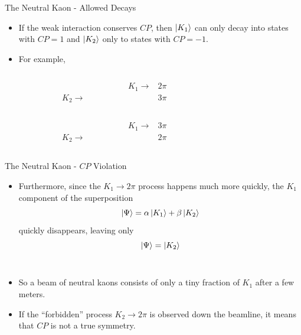 \documentclass{beamer}
\begin{document}
\begin{frame}{The Neutral Kaon \-- Allowed Decays}
  \begin{itemize}
    \item If the weak interaction conserves $CP$, then $\ket{K_1}$ can only decay into states with $CP=1$ and $\ket{K_2}$ only to states with $CP=-1$.
    \pause\
  \item For example,
    \begin{columns}
      \begin{column}{0.5\textwidth}
      \begin{align*}
        \quad \quad \quad \quad \quad \quad \quad \quad K_1 \rightarrow& 2\pi \\
        K_2 \rightarrow& 3\pi
      \end{align*}
      \end{column}
      \begin{column}{0.5\textwidth}
        \vfill
        \color{green}{Allowed}
      \end{column}
    \end{columns}
    \begin{columns}
      \begin{column}{0.5\textwidth}
      \begin{align*}
        \quad \quad \quad \quad \quad \quad \quad \quad K_1 \rightarrow& 3\pi \\
        K_2 \rightarrow& 2\pi
      \end{align*}
      \end{column}
      \begin{column}{0.5\textwidth}
        \vfill
        \color{red}{Forbidden}
      \end{column}
    \end{columns}
  \end{itemize}
\end{frame}

\begin{frame}{The Neutral Kaon \-- $CP$ Violation}
  \begin{itemize}
    \item Furthermore, since the $K_1 \rightarrow 2\pi$ process happens much more quickly, the $K_1$ component of the superposition
      \begin{equation*}
        \ket{\Psi} = \alpha\ket{K_1} + \beta\ket{K_2}
      \end{equation*}
      quickly disappears, leaving only
      \begin{equation*}
        \ket{\Psi} = \ket{K_2}
      \end{equation*}
      \pause\
    \item So a beam of neutral kaons consists of only a tiny fraction of $K_1$ after a few meters.
    \pause\
  \item If the ``forbidden'' process $K_2 \rightarrow 2\pi$ is observed down the beamline, it means that $CP$ is not a true symmetry.
  \end{itemize}
\end{frame}
\end{document}
